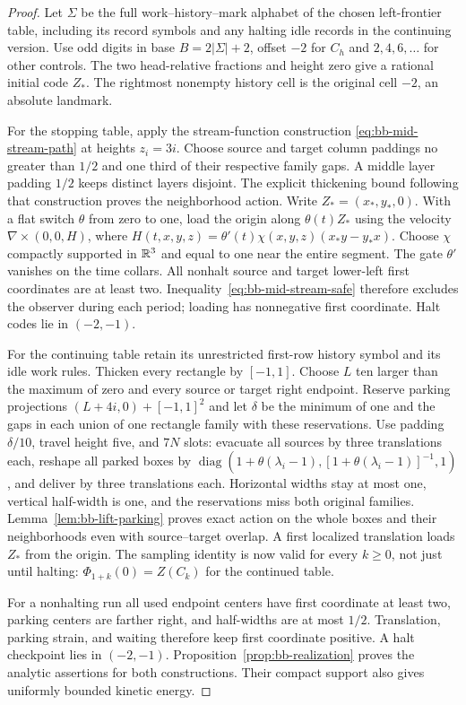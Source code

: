 \begin{proof}\label{proof:bb-mid-stream}\label{proof:bb-mid-parking}
Let $\Sigma$ be the full work--history--mark alphabet of the chosen
left-frontier table, including its record symbols and any halting idle
records in the continuing version. Use odd digits in base $B=2|\Sigma|+2$, offset $-2$ for $C_h$ and
$2,4,6,\ldots$ for other controls.  The two head-relative fractions
and height zero give a rational initial code $Z_*$.  The rightmost
nonempty history cell is the original cell $-2$, an absolute landmark.

For the stopping table, apply the stream-function construction
\eqref{eq:bb-mid-stream-path} at heights $z_i=3i$.
Choose source and target column paddings no greater than $1/2$ and
one third of their respective family gaps.  A middle layer padding
$1/2$ keeps distinct layers disjoint.  The explicit thickening bound
following that construction proves the neighborhood action.
Write $Z_*=(x_*,y_*,0)$. With a flat switch $\theta$ from zero to one,
load the origin along $\theta(t)Z_*$ using the velocity
$\nabla\times(0,0,H)$, where
$H(t,x,y,z)=\theta'(t)\chi(x,y,z)(x_*y-y_*x)$.
Choose $\chi$ compactly supported in $\mathbb R^3$ and equal to one near the
entire segment. The gate $\theta'$ vanishes on the time collars.
All nonhalt source and target lower-left first coordinates are at
least two.  Inequality~\eqref{eq:bb-mid-stream-safe} therefore
excludes the observer during each period; loading has nonnegative
first coordinate.  Halt codes lie in $(-2,-1)$.

For the continuing table retain its unrestricted first-row history
symbol and its idle work rules.  Thicken every rectangle by $[-1,1]$.
Choose $L$ ten larger than the maximum of zero and every source or
target right endpoint.  Reserve parking projections
$(L+4i,0)+[-1,1]^2$ and let $\delta$ be the minimum of one and the
gaps in each union of one rectangle family with these reservations.
Use padding $\delta/10$, travel height five, and $7N$ slots: evacuate
all sources by three translations each, reshape all parked boxes by
$\operatorname{diag}(1+\theta(\lambda_i-1),[1+\theta(\lambda_i-1)]^{-1},1)$,
and deliver by three translations each.  Horizontal widths stay at
most one, vertical half-width is one, and the reservations miss both
original families.  Lemma~\ref{lem:bb-lift-parking} proves exact action
on the whole boxes and their neighborhoods even with source--target
overlap.  A first localized translation loads $Z_*$ from the origin.
The sampling identity is now valid for every $k\ge0$, not just until
halting: $\Phi_{1+k}(0)=Z(C_k)$ for the continued table.

For a nonhalting run all used endpoint centers have first coordinate
at least two, parking centers are farther right, and half-widths are
at most $1/2$.  Translation, parking strain, and waiting therefore
keep first coordinate positive.  A halt checkpoint lies in $(-2,-1)$.
Proposition~\ref{prop:bb-realization} proves the analytic assertions
for both constructions.  Their compact support also gives uniformly
bounded kinetic energy.
\end{proof}
